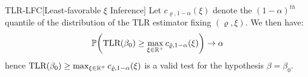 \begin{propositionp}{TLR-LFC}[Least-favorable \(\xi\) Inference]\label{prop:tlr-lfc}
Let \(c_{\varrho,1-\alpha}(\xi) \) denote the \((1-\alpha)^{th}\) {quantile} of the distribution of the TLR estimator fixing \((\varrho,\xi)\).
  We then have:
\begin{align*}
    \mathbb{P}\!\left(\textrm{TLR}(\beta_0) \geq \max_{\xi \in \mathbb{R}^+} c_{\hat\varrho,1-\alpha}(\xi)\right) \to \alpha
\end{align*}
hence \(\textrm{TLR}(\beta_0) \geq \max_{\xi \in \mathbb{R}^+} c_{\hat\varrho,1-\alpha}(\xi)\)  is a valid test for the hypothesis \(\beta=\beta_0\).
\end{propositionp}
